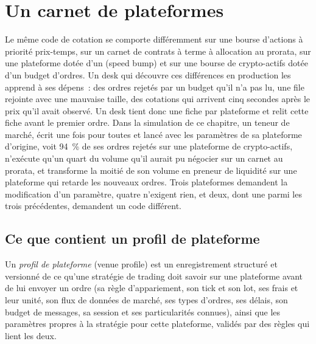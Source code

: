 \chapter{Un carnet de plateformes}\label{ch:hf:a-venue-playbook}

Le même code de cotation se comporte différemment sur une bourse d'actions à priorité prix-temps, sur un carnet de contrats à terme à allocation au prorata, sur une plateforme dotée d'un  (speed bump) et sur une bourse de crypto-actifs
dotée d'un budget d'ordres. Un desk qui découvre ces différences en production les apprend à ses dépens~: des ordres rejetés par un budget
qu'il n'a pas lu, une file rejointe avec une mauvaise taille, des cotations qui arrivent cinq secondes après le prix qu'il avait observé. Un desk tient donc une fiche par plateforme et
relit cette fiche avant le premier ordre. Dans la simulation de ce chapitre, un teneur de marché, écrit une fois pour toutes et lancé avec les paramètres de sa plateforme d'origine, voit 94~\% de ses
ordres rejetés sur une plateforme de crypto-actifs, n'exécute qu'un quart du volume qu'il aurait pu négocier sur un carnet au prorata, et transforme la moitié de son volume en preneur de liquidité sur une plateforme qui
retarde les nouveaux ordres. Trois plateformes demandent la modification d'un paramètre, quatre n'exigent rien, et deux, dont une parmi les trois précédentes, demandent un code différent.

\section{Ce que contient un profil de plateforme}

\begin{definition}\label{def:hf:a-venue-playbook:profile}
Un \emph{profil de plateforme} (venue profile) est un enregistrement structuré et versionné de ce qu'une stratégie de trading doit savoir sur une plateforme avant de lui envoyer
un ordre (sa règle d'appariement, son tick et son lot, ses frais et leur unité, son flux de données de marché, ses types d'ordres, ses délais, son budget de messages, sa session et ses particularités connues),
ainsi que les paramètres propres à la stratégie pour cette plateforme, validés par des règles qui lient les deux.
\end{definition}

